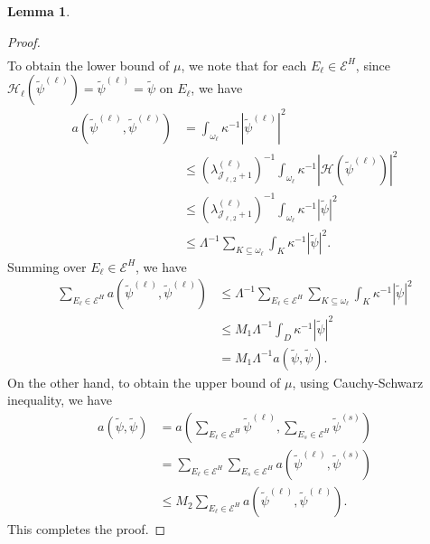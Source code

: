 \documentclass{article}[11pt]
\theoremstyle{definition}
\newtheorem{lemma}{Lemma}[section]
\begin{document}
\begin{lemma}
\begin{proof}
\[\begin{split}
\end{split}
\] 
To obtain the lower bound of $\mu$, we note that for each $E_\ell \in \mathcal{E}^H$, 
since $\mathcal{H}_\ell(\tilde{\psi}^{(\ell)}) = \tilde{\psi}^{(\ell)} = \tilde{\psi}$ on $E_\ell$, we have 
\[
\begin{split}
a(\tilde{\psi}^{(\ell)},\tilde{\psi}^{(\ell)}) 
& = \int_{\omega_\ell} \kappa^{-1} \left\vert \tilde{\psi}^{(\ell)} \right\vert^2 \\
& \leq \left(\lambda_{\mathcal{J}_{\ell,2} +1}^{(\ell)}\right)^{-1} \int_{\omega_\ell} \kappa^{-1} \left\vert \mathcal{H}(\tilde{\psi}^{(\ell)}) \right\vert^2 \\ 
& \leq \left(\lambda_{\mathcal{J}_{\ell,2} +1}^{(\ell)}\right)^{-1} \int_{\omega_\ell} \kappa^{-1} \left\vert \tilde{\psi} \right\vert^2 \\
& \leq \Lambda^{-1} \sum_{K \subseteq \omega_\ell} \int_{K} \kappa^{-1} \left\vert \tilde{\psi} \right\vert^2. 
\end{split}
\]
Summing over $E_\ell \in \mathcal{E}^H$, we have 
\[
\begin{split}
\sum_{E_\ell \in \mathcal{E}^H} a(\tilde{\psi}^{(\ell)},\tilde{\psi}^{(\ell)}) 
& \leq \Lambda^{-1} \sum_{E_\ell \in \mathcal{E}^H} \sum_{K \subseteq \omega_\ell} \int_{K} \kappa^{-1} \left\vert \tilde{\psi} \right\vert^2 \\
& \leq M_1 \Lambda^{-1} \int_{D} \kappa^{-1} \left\vert \tilde{\psi} \right\vert^2 \\
& = M_1 \Lambda^{-1} a(\tilde{\psi}, \tilde{\psi}). 
\end{split}
\]
On the other hand, to obtain the upper bound of $\mu$, using Cauchy-Schwarz inequality, we have 
\[
\begin{split}
a(\tilde{\psi}, \tilde{\psi})
& = a\left(\sum_{E_\ell \in \mathcal{E}^H} \tilde{\psi}^{(\ell)}, \sum_{E_s \in \mathcal{E}^H} \tilde{\psi}^{(s)} \right) \\
& = \sum_{E_\ell \in \mathcal{E}^H}  \sum_{E_s \in \mathcal{E}^H} a(\tilde{\psi}^{(\ell)}, \tilde{\psi}^{(s)}) \\
& \leq M_2 \sum_{E_\ell \in \mathcal{E}^H} a(\tilde{\psi}^{(\ell)}, \tilde{\psi}^{(\ell)}).
\end{split} 
\]
This completes the proof. 
\end{proof}
\end{lemma}
\end{document}
